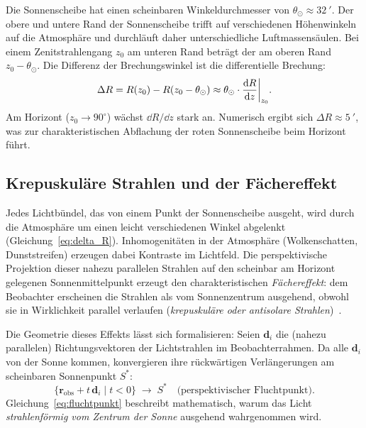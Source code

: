 ﻿\documentclass[12pt,a4paper]{article}
\begin{document}
Die Sonnenscheibe hat einen scheinbaren Winkeldurchmesser von
$\theta_\odot \approx \SI{32}{\arcminute}$.
Der obere und untere Rand der Sonnenscheibe trifft auf
verschiedenen Höhenwinkeln auf die Atmosphäre und durchläuft
daher unterschiedliche Luftmassensäulen.
Bei einem Zenitstrahlengang $z_0$ am unteren Rand beträgt der
am oberen Rand $z_0 - \theta_\odot$.
Die Differenz der Brechungswinkel ist die differentielle Brechung:
\begin{equation}
  \Delta R = R(z_0) - R(z_0 - \theta_\odot)
           \approx \theta_\odot \cdot \dv{R}{z}\bigg|_{z_0}.
  \label{eq:delta_R}
\end{equation}
Am Horizont ($ z_0 \to 90^{\circ}$) wächst $\dd R / \dd z$ stark an.
Numerisch ergibt sich $\Delta R \approx \SI{5}{\arcminute}$,
was zur charakteristischen Abflachung der roten Sonnenscheibe
beim Horizont führt.

\subsection{Krepuskuläre Strahlen und der Fächereffekt}

Jedes Lichtbündel, das von einem Punkt der Sonnenscheibe ausgeht,
wird durch die Atmosphäre um einen leicht verschiedenen Winkel
abgelenkt (Gleichung~\ref{eq:delta_R}).
Inhomogenitäten in der Atmosphäre (Wolkenschatten, Dunststreifen)
erzeugen dabei Kontraste im Lichtfeld.
Die perspektivische Projektion dieser nahezu parallelen Strahlen
auf den scheinbar am Horizont gelegenen Sonnenmittelpunkt erzeugt
den charakteristischen \emph{Fächereffekt}: 
dem Beobachter erscheinen die Strahlen als vom Sonnenzentrum ausgehend,
obwohl sie in Wirklichkeit parallel verlaufen
(\emph{krepuskuläre oder antisolare Strahlen})~\citep{MinnaertNaturalOptics}.

Die Geometrie dieses Effekts lässt sich formalisieren:
Seien $\mathbf{d}_i$ die (nahezu parallelen) Richtungsvektoren der
Lichtstrahlen im Beobachterrahmen.
Da alle $\mathbf{d}_i$ von der Sonne kommen, konvergieren ihre rückwärtigen
Verlängerungen am scheinbaren Sonnenpunkt $S^*$:
\begin{equation}
  \{\mathbf{r}_{\text{obs}} + t\,\mathbf{d}_i\;\big|\; t < 0\}
  \;\longrightarrow\; S^*
  \quad \text{(perspektivischer Fluchtpunkt).}
  \label{eq:fluchtpunkt}
\end{equation}
Gleichung~\eqref{eq:fluchtpunkt} beschreibt mathematisch,
warum das Licht \emph{strahlenförmig vom Zentrum der Sonne}
ausgehend wahrgenommen wird.
\end{document}
